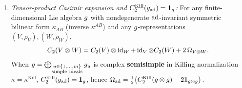 \begin{proposition}[{Proof of $C_2(V\otimes W) = C_2(V)\otimes\id + \id\otimes C_2(W) + 2\Omega_{V\otimes W}$, semisimple vs.\ simple hypotheses on $X_2$, and Jacobi vanishing $\Omega_{\mathrm{ad}}|_{X_2} = 0$}]
\label{prop:casimir-x2-semisimple}
\leavevmode
\begin{enumerate}[label=(\arabic*),leftmargin=*]
  \item \emph{Tensor-product Casimir expansion and $C_2^{\mathrm{Kill}}(g_{\mathrm{ad}}) = \mathbf{1}_{g}$:} For any finite-dimensional Lie algebra $g$ with nondegenerate $\operatorname{ad}$-invariant symmetric bilinear form $\kappa_{AB}$ (inverse $\kappa^{AB}$) and any $g$-representations $(V,\rho_V), (W,\rho_W)$,
  \begin{equation}
  \label{eq:casimir-tensor-expansion}
  C_2(V\otimes W) = C_2(V)\otimes\operatorname{id}_W + \operatorname{id}_V\otimes C_2(W) + 2\,\Omega_{V\otimes W}.
  \end{equation}
  When $\fg = \bigoplus_{\substack{u\in\{1,\dots,m\}\\\mathrm{simple\ ideals}}}\fg_u$ is complex \textbf{semisimple} in Killing normalization $\kappa = \kappa^{\mathrm{Kill}}$, $C_2^{\mathrm{Kill}}(g_{\mathrm{ad}}) = \mathbf{1}_{g}$, hence $\Omega_{\mathrm{ad}} = \frac{1}{2}\bigl(C_2^{\mathrm{Kill}}(g\otimes g) - 2\mathbf{1}_{g\otimes g}\bigr)$.


\end{enumerate}
\end{proposition}
